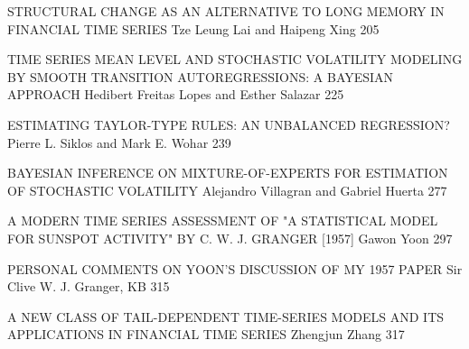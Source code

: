 STRUCTURAL CHANGE AS AN ALTERNATIVE TO LONG MEMORY IN FINANCIAL TIME SERIES
Tze Leung Lai and Haipeng Xing 205



TIME SERIES MEAN LEVEL AND STOCHASTIC VOLATILITY MODELING BY SMOOTH TRANSITION AUTOREGRESSIONS: A BAYESIAN APPROACH
Hedibert Freitas Lopes and Esther Salazar 225



ESTIMATING TAYLOR-TYPE RULES: AN UNBALANCED REGRESSION?
Pierre L. Siklos and Mark E. Wohar 239




BAYESIAN INFERENCE ON MIXTURE-OF-EXPERTS FOR ESTIMATION OF STOCHASTIC VOLATILITY
Alejandro Villagran and Gabriel Huerta 277



A MODERN TIME SERIES ASSESSMENT OF "A STATISTICAL MODEL FOR SUNSPOT ACTIVITY" BY C. W. J. GRANGER [1957]
Gawon Yoon 297



PERSONAL COMMENTS ON YOON'S DISCUSSION OF MY 1957 PAPER
Sir Clive W. J. Granger, KB 315



A NEW CLASS OF TAIL-DEPENDENT TIME-SERIES MODELS AND ITS APPLICATIONS IN FINANCIAL TIME SERIES
Zhengjun Zhang 317

